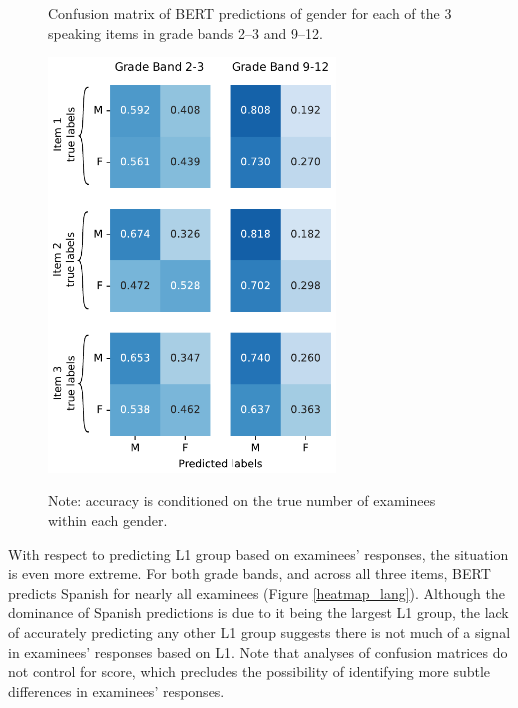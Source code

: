 \documentclass [PhD] {uclathes}
\begin{document}
\begin{figure}[!htb]
    \centering
    \caption{Confusion matrix of BERT predictions of gender for each of the 3 speaking items in grade bands 2–3 and 9–12.}    
    \includegraphics[width=3in]{figures/20230516_gender805_heatmap_edit.pdf}
    \label{heatmap_gend}
\caption*{\small Note: accuracy is conditioned on the true number of examinees within each gender.}
\end{figure}

With respect to predicting L1 group based on examinees’ responses, the situation is even more extreme. For both grade bands, and across all three items, BERT predicts Spanish for nearly all examinees (Figure \ref{heatmap_lang}). Although the dominance of Spanish predictions is due to it being the largest L1 group, the lack of accurately predicting any other L1 group suggests there is not much of a signal in examinees’ responses based on L1. Note that analyses of confusion matrices do not control for score, which precludes the possibility of identifying more subtle differences in examinees’ responses. 
\end{document}
